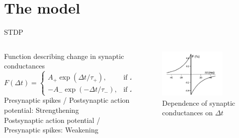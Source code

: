 \documentclass[aspectratio=169]{beamer}
\begin{document}
\section{The model}
\begin{frame}{STDP}
	\begin{columns}
		\begin{column}{0.5\textwidth}
 Function describing change in synaptic conductances
				$$F(\Delta t ) = \begin{cases}
				A_+ \exp(\Delta t/\tau_+), & \text{if } \Delta t < 0 \\
				- A_- \exp(-\Delta t/\tau_-), & \text{if } \Delta t \geq 0
				\end{cases}$$
				Presynaptic spikes / Postsynaptic action potential: Strengthening\\
				Postsynaptic action potential / Presynaptic spikes: Weakening

		\end{column}
		\begin{column}{0.5\textwidth}
			\begin{figure}
				
				\centering
				\includegraphics[width=0.8\textwidth]{CN1}
				\caption{Dependence of synaptic conductances on $\Delta t$ \cite{article}}
			\end{figure}
		\end{column}
	\end{columns}
\end{frame}
\end{document}
